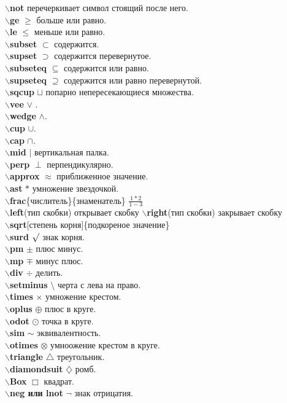 \documentclass{article}
\newcommand{\bs}{$\backslash$}
\newcommand{\bd}[1]{{\bfseries #1}} %
\newcommand{\bb}[1]{\bd{\bs #1}} %
\begin{document}
\bb{not} перечеркивает символ стоящий после него.\\
\bb{ge} $\ge$ больше или равно.\\
\bb{le} $\le$ меньше или равно.\\
\bb{subset} $\subset$ содержится.\\
\bb{supset} $\supset$ содержится перевернутое.\\
\bb{subseteq} $\subseteq$ содержится или равно.\\
\bb{supseteq} $\supseteq$ содержится или равно перевернутой.\\
\bb{sqcup} $\sqcup$ попарно непересекающиеся множества.\\
\bb{vee} $\vee$ .\\
\bb{wedge} $\wedge$.\\
\bb{cup} $\cup$.\\
\bb{cap} $\cap$.\\
\bb{mid} $\mid$ вертикальная палка.\\
\bb{perp} $\perp$ перпендикулярно.\\
\bb{approx} $\approx$ приближенное значение.\\
\bb{ast} $\ast$ умножение звездочкой.\\
\bb{frac}\{числитель\}\{знаменатель\} $\frac{1*2}{1-3}$\\
\bb{left}(тип скобки) открывает скобку \bb{right}(тип скобки) закрывает скобку\\
\bb{sqrt}[степень корня]\{подкореное значение\}\\
\bb{surd} $\surd$ знак корня.\\
\bb{pm} $\pm$ плюс минус.\\
\bb{mp} $\mp$ минус плюс.\\
\bb{div} $\div$ делить.\\
\bb{setminus} $\setminus$ черта с лева на право.\\
\bb{times} $\times$ умножение крестом.\\
\bb{oplus} $\oplus$ плюс в круге.\\
\bb{odot} $\odot$ точка в круге.\\
\bb{sim} $\sim$ эквивалентность.\\
\bb{otimes} $\otimes$ умноожение крестом в круге.\\
\bb{triangle} $\triangle$ треугольник.\\
\bb{diamondsuit} $\diamondsuit$ ромб.\\
\bb{Box} $\Box$ квадрат.\\
\bb{neg или lnot} $\lnot$ знак отрицатия.\\
\end{document}

